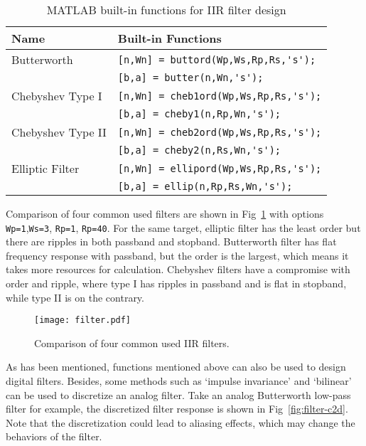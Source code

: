 \begin{table}[!htb]
    \centering
    \caption{MATLAB built-in functions for IIR filter design}
    \label{tab:filterdesign}
    \begin{tabular}{ll}
        \toprule
        Name & Built-in Functions  \\
        \midrule 
        Butterworth & \verb|[n,Wn] = buttord(Wp,Ws,Rp,Rs,'s');|        \\
                    & \verb|[b,a] = butter(n,Wn,'s');|                 \\
        Chebyshev Type I & \verb|[n,Wn] = cheb1ord(Wp,Ws,Rp,Rs,'s');|  \\
                    & \verb|[b,a] = cheby1(n,Rp,Wn,'s');|              \\
        Chebyshev Type II & \verb|[n,Wn] = cheb2ord(Wp,Ws,Rp,Rs,'s');| \\
                    & \verb|[b,a] = cheby2(n,Rs,Wn,'s');|              \\
        Elliptic Filter & \verb|[n,Wn] = ellipord(Wp,Ws,Rp,Rs,'s');|   \\
                    & \verb|[b,a] = ellip(n,Rp,Rs,Wn,'s');|            \\
        \bottomrule
    \end{tabular}
\end{table}


Comparison of four common used filters are shown in Fig~\ref{fig:filters} with options \verb|Wp=1|,\verb|Ws=3|, \verb|Rp=1|, \verb|Rp=40|. For the same target, elliptic filter has the least order but there are ripples in both passband and stopband. Butterworth filter has flat frequency response with passband, but the order is the largest, which means it takes more resources for calculation. Chebyshev filters have a compromise with order and ripple, where type I has ripples in passband and is flat in stopband, while type II is on the contrary.


\begin{figure}[!htb]
    \centering
    \texttt{[image: filter.pdf]}
    \caption{Comparison of four common used IIR filters.}
    \label{fig:filters}
\end{figure}


As has been mentioned, functions mentioned above can also be used to design digital filters. Besides, some methods such as `impulse invariance' and `bilinear' can be used to discretize an analog filter. Take an analog Butterworth low-pass filter for example, the discretized filter response is shown in Fig~\ref{fig:filter-c2d}. Note that the discretization could lead to aliasing effects, which may change the behaviors of the filter.


